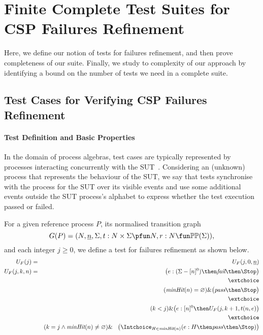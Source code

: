 \section{Finite Complete Test Suites for CSP Failures Refinement}
\label{sec:finitecompletefails}

Here, we define our notion of tests for failures refinement, and then prove
completeness of our suite. Finally, we study to complexity of our approach by
identifying a bound on the number of tests we need in a complete suite.

\subsection{Test Cases for Verifying CSP Failures Refinement}

\paragraph{Test Definition and Basic Properties}
In the domain of process algebras, test cases are typically represented by
processes interacting concurrently with the
SUT~\cite{Hennessy:1988:ATP:50497}. Considering an (unknown) process that
represents the behaviour of the SUT, we say that tests synchronise with the
process for the SUT over its visible events and use some additional events
outside the SUT process's alphabet to express whether the test execution
passed or failed.

For a given reference process $P$, its normalised transition graph
$$
G(P) = ( N, \ii n, \Sigma, t : N\times\Sigma \pfun N, r : N \fun \mathbb{P}\mathbb{P}(\Sigma)),
$$
and each integer $j\ge 0$, we define a test for failures refinement as shown
below.
%
\begin{eqnarray}
\label{eq:UFP}
U_F(j) & = & U_F(j,0,\ii n)
\\
U_F(j,k,n) & = & \big(e:(\Sigma - [n]^0)  \then \efail\then \Stop \big)
\label{eq:ufa}
\\ & & \extchoice \nonumber
\\ & & (\minhits(n) =   \varnothing  )    \&   \big( \epass \then \Stop \big)
\label{eq:ufb}
\\ & & \extchoice \nonumber
\\ & & (k < j) \& \big(e:[n]^0   \then U_F(j,k+1,t(n,e) \big)
\label{eq:ufc}
\\ & & \extchoice \nonumber
\\ & & (k = j \wedge \minhits(n)\neq\varnothing) \& \taba \big( \Intchoice_{H\in\minhits(n)} (e:H   \then \epass \then\Stop   )  \big)
\label{eq:ufd}
\end{eqnarray}

